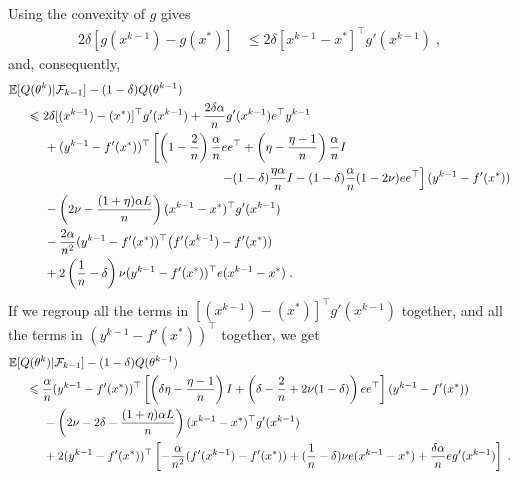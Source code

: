 \documentclass{article}
\newcommand{\idm}{I}
\def\E{_{\scriptscriptstyle E}}
\def \E{{\mathbb E}}
\def \E{{\mathbb E}}
\begin{document}
Using the convexity of $g$ gives
\begin{align*}
2 \delta[g (x^{k-1}) - g(x^\ast) ] &\leqslant 2 \delta[x^{k-1} -x^\ast ]^\top g'(x^{k-1}) \; ,
\end{align*}
and, consequently,
\begin{align*}
& \E [ Q(\theta^k) | \mathcal{F}_{k-1} ] - ( 1 - \delta) Q(\theta^{k-1}) \\
& \hspace*{.5cm}\leqslant
2 \delta[(x^{k-1}) -(x^\ast) ]^\top g'(x^{k-1}) + \frac{2\delta\alpha}{n} g'(x^{k-1}) e^\top y^{k-1}\\
&\hspace*{1cm} + (y^{k-1} - f'(x^\ast))^\top
\left[
\left(1-\frac{2}{n}\right) \frac{\alpha}{n} ee^\top + \left(\eta - \frac{\eta-1}{n}\right) \frac{\alpha}{n} \idm
\right. \\
& \hspace*{6cm} \left.
- (1-\delta) \frac{\eta \alpha}{n} \idm - (1-\delta) \frac{\alpha}{n} (1 - 2 \nu )ee^\top
\right] (y^{k-1} - f'(x^\ast)) \\
&\hspace*{1cm} - \left( 2 \nu - \frac{(1+\eta) \alpha L}{n}\right)(x^{k-1} -x^\ast)^\top g'(x^{k-1}) \\
&\hspace*{1cm} - \frac{2\alpha}{n^2} (y^{k-1} - f'(x^\ast))^\top \big  ( f'(x^{k-1}) - f'(x^\ast)) \\
&\hspace*{1cm} + 2 \left(\frac{1}{n}-\delta\right) \nu (y^{k-1} - f'(x^\ast))^\top e (x^{k-1} -x^\ast) \; .
\end{align*}
If we regroup all the terms in $[(x^{k-1}) -(x^\ast) ]^\top g'(x^{k-1})$ together, and all the terms in $(y^{k-1} - f'(x^\ast))^\top$ together, we get
\begin{align*}
& \E [ Q(\theta^k) | \mathcal{F}_{k-1} ] - ( 1 - \delta) Q(\theta^{k-1}) \\
& \hspace*{.5cm} \leqslant \frac{\alpha}{n} (y^{k-1} - f'(x^\ast))^\top
\left[\left( \delta \eta - \frac{\eta-1}{n} \right) \idm +\left( \delta -\frac{2}{n}  + 2 \nu (1-\delta) \right) ee^\top \right] (y^{k-1} - f'(x^\ast)) \\
&\hspace*{1cm} - \left( 2 \nu - 2 \delta - \frac{(1+\eta) \alpha L}{n} \right)(x^{k-1} -x^\ast)^\top g'(x^{k-1}) \\
&\hspace*{1cm} + 2 (y^{k-1} - f'(x^\ast))^\top\left[- \frac{\alpha}{n^2}  ( f'(x^{k-1}) - f'(x^\ast)) + (\frac{1}{n}-\delta) \nu e (x^{k-1} -x^\ast)
+\frac{\delta \alpha}{n} e g'(x^{k-1})  \right] \; .
\end{align*}
\end{document}
